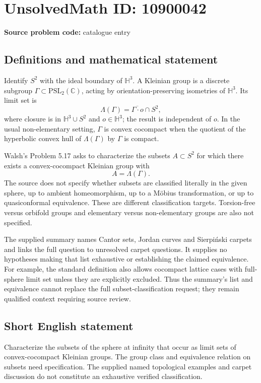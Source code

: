 \documentclass[11pt]{article}
\newcommand{\C}{\mathbb{C}}
\begin{document}
\section*{UnsolvedMath ID: 10900042}
\textbf{Source problem code:} catalogue entry
\subsection{Definitions and mathematical statement}
Identify \(S^2\) with the ideal boundary of \(\mathbb H^3\). A Kleinian group is a discrete subgroup \(\Gamma\subset\mathrm{PSL}_2(\C)\), acting by orientation-preserving isometries of \(\mathbb H^3\). Its limit set is
\[
 \Lambda(\Gamma)=\overline{\Gamma\cdot o}\cap S^2,
\]
where closure is in \(\mathbb H^3\cup S^2\) and \(o\in\mathbb H^3\); the result is independent of \(o\). In the usual non-elementary setting, \(\Gamma\) is convex cocompact when the quotient of the hyperbolic convex hull of \(\Lambda(\Gamma)\) by \(\Gamma\) is compact.

Walsh's Problem 5.17 asks to characterize the subsets \(A\subset S^2\) for which there exists a convex-cocompact Kleinian group with
\[
 A=\Lambda(\Gamma).
\]
The source does not specify whether subsets are classified literally in the given sphere, up to ambient homeomorphism, up to a Möbius transformation, or up to quasiconformal equivalence. These are different classification targets. Torsion-free versus orbifold groups and elementary versus non-elementary groups are also not specified.

The supplied summary names Cantor sets, Jordan curves and Sierpiński carpets and links the full question to unresolved carpet questions. It supplies no hypotheses making that list exhaustive or establishing the claimed equivalence. For example, the standard definition also allows cocompact lattice cases with full-sphere limit set unless they are explicitly excluded. Thus the summary's list and equivalence cannot replace the full subset-classification request; they remain qualified context requiring source review.
\subsection{Short English statement}
Characterize the subsets of the sphere at infinity that occur as limit sets of convex-cocompact Kleinian groups. The group class and equivalence relation on subsets need specification. The supplied named topological examples and carpet discussion do not constitute an exhaustive verified classification.
\end{document}
